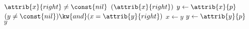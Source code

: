 \begin{codebox}
\li \If $\attrib{x}{right} \neq \const{nil}$
\li \Then 
		\Return {}$(\attrib{x}{right})$
\li \Else
\li 	$y \gets \attrib{x}{p}$
\li 	\While $(y \neq \const{nil}) \kw{ and } (x = \attrib{y}{right})$
\li 	\Do
			$x \gets y$
\li 		$y \gets \attrib{y}{p}$
		\End
\li 	\Return $y$
	\End
\end{codebox}